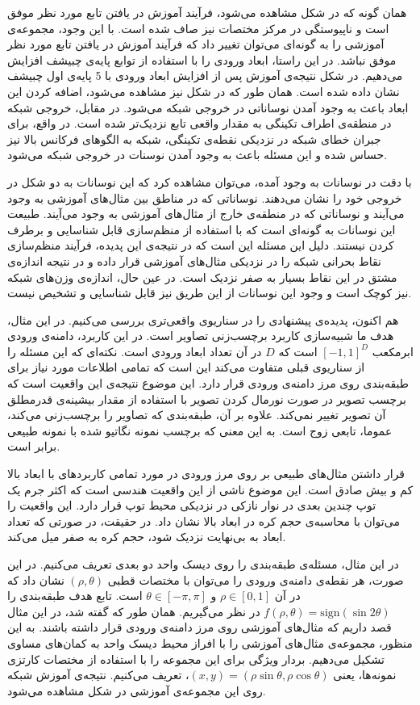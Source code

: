 \documentclass[12pt,onecolumn,a4paper]{article}
\begin{document}
همان گونه که در شکل مشاهده می‌شود، فرآیند آموزش در یافتن تابع مورد نظر موفق است و ناپیوستگی در مرکز مختصات نیز صاف شده است. با این وجود، مجموعه‌ی آموزشی را به گونه‌ای می‌توان تغییر داد که فرآیند آموزش در یافتن تابع مورد نظر موفق نباشد. در این راستا، ابعاد ورودی را با استفاده از توابع  پایه‌ی چبیشف افزایش می‌دهیم. در شکل نتیجه‌ی آموزش پس از افزایش ابعاد ورودی با 5 پایه‌ی اول چبیشف نشان داده شده است. همان طور که در شکل نیز مشاهده می‌شود، اضافه کردن این ابعاد باعث به وجود آمدن نوساناتی در خروجی شبکه می‌شود. در مقابل، خروجی شبکه در منطقه‌ی اطراف تکینگی به مقدار واقعی تابع نزدیک‌تر شده است. در واقع، برای جبران خطای شبکه در نزدیکی نقطه‌ی تکینگی، شبکه به الگوهای فرکانس بالا نیز حساس شده و این مسئله باعث به وجود آمدن نوسنات در خروجی شبکه می‌شود.

با دقت در نوسانات به وجود آمده، می‌توان مشاهده کرد که این نوسانات به دو شکل در خروجی خود را نشان می‌دهند. نوساناتی که در مناطق بین مثال‌های آموزشی به وجود می‌آیند و نوساناتی که در منطقه‌ی خارج از مثال‌های آموزشی به وجود می‌آیند. طبیعت این نوسانات به گونه‌ای است که با استفاده از منظم‌سازی قابل شناسایی و برطرف کردن نیستند. دلیل این مسئله این است که در نتیجه‌ی این پدیده، فرآیند منظم‌سازی نقاط بحرانی شبکه را در نزدیکی مثال‌های آموزشی قرار داده و در نتیجه اندازه‌ی مشتق در این نقاط بسیار به صفر نزدیک است. در عین حال، اندازه‌ی وزن‌های شبکه نیز کوچک است و وجود این نوسانات از این طریق نیز قابل شناسایی و تشخیص نیست.

هم اکنون، پدیده‌ی پیشنهادی را در سناریوی واقعی‌تری بررسی می‌کنیم. در این مثال، هدف ما شبیه‌سازی کاربرد برچسب‌زنی تصاویر است. در این کاربرد، دامنه‌ی ورودی ابرمکعب $[-1,1]^D$ 
است که $D$ 
در آن تعداد ابعاد ورودی است. نکته‌ای که این مسئله را از سناریوی قبلی متفاوت می‌کند این است که تمامی اطلاعات مورد نیاز برای طبقه‌بندی روی مرز دامنه‌ی ورودی قرار دارد. این موضوع نتیجه‌ی این واقعیت است که برچسب تصویر در صورت نورمال کردن تصویر با استفاده از مقدار بیشینه‌ی قدرمطلق آن تصویر تغییر نمی‌کند. علاوه بر آن، طبقه‌بندی که تصاویر را برچسب‌زنی می‌کند، عموما، تابعی زوج است. به این معنی که برچسب نمونه نگاتیو شده با نمونه طبیعی برابر است.

قرار داشتن مثال‌های طبیعی بر روی مرز ورودی در مورد تمامی کاربردهای با ابعاد بالا کم و بیش صادق است. این موضوع ناشی از این واقعیت هندسی است که اکثر جرم یک توپ چندین بعدی در نوار نازکی در نزدیکی محیط توپ قرار دارد. این واقعیت را می‌توان با محاسبه‌ی حجم کره در ابعاد بالا نشان داد. در حقیقت، در صورتی که تعداد ابعاد به بی‌نهایت نزدیک شود، حجم کره به صفر میل می‌کند.

در این مثال، مسئله‌ی طبقه‌بندی را روی دیسک واحد دو بعدی تعریف می‌کنیم. در این صورت، هر نقطه‌ی دامنه‌ی ورودی را می‌توان با مختصات قطبی $(\rho,\theta)$ 
 نشان داد که در آن $\rho \in [0,1]$ و $\theta \in [-\pi,\pi]$ است. 
 تابع هدف طبقه‌بندی را $f(\rho,\theta)=\mathrm{sign}(\sin 2\theta)$ در نظر می‌گیریم.
همان طور که گفته شد، در این مثال قصد داریم که مثال‌های آموزشی روی مرز دامنه‌ی ورودی قرار داشته باشند. به این منظور، مجموعه‌ی مثال‌های آموزشی را با افراز محیط دیسک واحد به کمان‌های مساوی تشکیل می‌دهیم. بردار ویژگی برای این مجموعه را با استفاده از مختصات کارتزی نمونه‌ها، یعنی $(x,y)=(\rho\sin\theta,\rho\cos\theta)$، تعریف می‌کنیم. نتیجه‌ی آموزش شبکه روی این مجموعه‌ی آموزشی در شکل مشاهده می‌شود.
\end{document}
